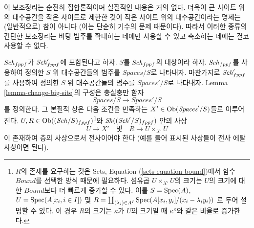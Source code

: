 \noindent
이 보조정리는 순전히 집합론적이며 실질적인 내용은 거의 없다.
더욱이 큰 사이트 위의 대수공간을 작은 사이트로 제한한 것이 작은
사이트 위의 대수공간이라는 명제는 (일반적으로) 참이 아니다
(이는 단순히 기수의 문제 때문이다). 따라서 이러한 종류의 간단한
보조정리는 바탕 범주를 확대하는 데에만 사용할 수 있고 축소하는
데에는 결코 사용할 수 없다.

\begin{lemma}
\label{lemma-fully-faithful}
$\mathit{Sch}_{fppf}$가 $\mathit{Sch}'_{fppf}$에 포함된다고 하자.
$S$를 $\mathit{Sch}_{fppf}$의 대상이라 하자. $\mathit{Sch}_{fppf}$를 사용하여
정의한 $S$ 위 대수공간들의 범주를 $\textit{Spaces}/S$로 나타내자.
마찬가지로 $\mathit{Sch}'_{fppf}$를 사용하여 정의한 $S$ 위 대수공간들의
범주를 $\textit{Spaces}'/S$로 나타내자. Lemma
\ref{lemma-change-big-site}의 구성은 충실충만 함자
$$
\textit{Spaces}/S \longrightarrow \textit{Spaces}'/S
$$
를 정의한다. 그 본질적 상은 다음 조건을 만족하는
$X' \in \mathop{\mathrm{Ob}}\nolimits(\textit{Spaces}'/S)$들로 이루어진다.
$U, R \in \mathop{\mathrm{Ob}}\nolimits((\mathit{Sch}/S)_{fppf})$\footnote{$R$의 존재를 요구하는 것은
Sets, Equation (\ref{sets-equation-bound})에서 함수 $Bound$를
선택한 방식 때문에 필요하다. 섬유곱 $U \times_{X'} U$의 크기는
$U$의 크기에 대한 $Bound$보다 더 빠르게 증가할 수 있다. 이를
$S = \mathop{\mathrm{Spec}}(A)$, $U = \mathop{\mathrm{Spec}}(A[x_i, i \in I])$ 및
$R = \coprod_{(\lambda_i) \in A^I} \mathop{\mathrm{Spec}}(A[x_i, y_i]/(x_i - \lambda_i y_i))$
로 두어 설명할 수 있다. 이 경우 $R$의 크기는 $\kappa$가 $U$의
크기일 때 $\kappa^\kappa$와 같은 비율로 증가한다.}와
$\mathop{\mathit{Sh}}\nolimits((\mathit{Sch}'/S)_{fppf})$ 안의 사상
$$
U \longrightarrow X'
\quad\text{및}\quad
R \longrightarrow U \times_{X'} U
$$
이 존재하여 층의 사상으로서 전사이어야 한다
(예를 들어 표시된 사상들이 전사 에탈 사상이면 된다).
\end{lemma}

